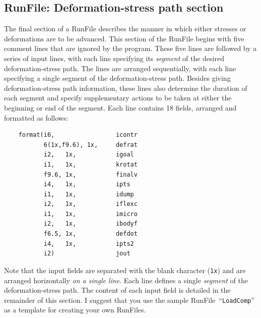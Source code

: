 \documentclass[letterpaper,11pt]{article}
\newcommand{\RunFile}{\textsf{RunFile}}
\begin{document}
\subsection{\textsf{RunFile}: Deformation-stress path section}%
\label{sec:runfile2}
The final section of a \textsf{RunFile} describes the manner in which
either stresses or deformations are to be advanced.
This section of the \textsf{RunFile}
begins with five comment lines that are ignored by the
program.
These five lines are followed by a series of input lines, 
with each line specifying
its \emph{segment} of the desired deformation-stress path.
The lines are arranged sequentially, with each
line specifying a single segment of the deformation-stress path.
Besides giving 
deformation-stress path information, these lines also 
determine the duration of each segment and
specify supplementary actions to be taken at 
either the beginning or end of the segment.
Each line contains 18 fields, arranged and formatted as follows:
\begin{verbatim}
    format(i6,                 icontr
           6(1x,f9.6), 1x,     defrat
           i2,   1x,           igoal
           i1,   1x,           krotat
           f9.6, 1x,           finalv
           i4,   1x,           ipts
           i1,   1x,           idump
           i2,   1x,           iflexc
           i1,   1x,           imicro
           i2,   1x,           ibodyf
           f6.5, 1x,           defdot
           i4,   1x,           ipts2
           i2)                 jout
\end{verbatim}
Note that the input fields are separated with the blank character
(\texttt{1x}) and are arranged horizontally \emph{on a single line}.
Each line defines a single \emph{segment} of the deformation-stress path.
The content of each input field is detailed in the remainder of this section.
I suggest that you use the sample \RunFile\ ``\texttt{LoadComp}''
as a template for creating your own \RunFile s.
\end{document}
